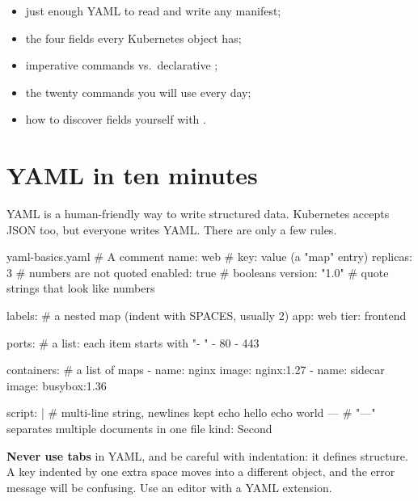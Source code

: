 
\begin{objectives}
\begin{itemize}
  \item just enough YAML to read and write any manifest;
  \item the four fields every Kubernetes object has;
  \item imperative commands vs.\ declarative ;
  \item the twenty  commands you will use every day;
  \item how to discover fields yourself with .
\end{itemize}
\end{objectives}

\section{YAML in ten minutes}

YAML is a human-friendly way to write structured data. Kubernetes accepts JSON
too, but everyone writes YAML. There are only a few rules.

\begin{yamlcode}{yaml-basics.yaml}
# A comment
name: web                 # key: value (a "map" entry)
replicas: 3               # numbers are not quoted
enabled: true             # booleans
version: "1.0"            # quote strings that look like numbers

labels:                   # a nested map (indent with SPACES, usually 2)
  app: web
  tier: frontend

ports:                    # a list: each item starts with "- "
  - 80
  - 443

containers:               # a list of maps
  - name: nginx
    image: nginx:1.27
  - name: sidecar
    image: busybox:1.36

script: |                 # multi-line string, newlines kept
  echo hello
  echo world
---
# "---" separates multiple documents in one file
kind: Second
\end{yamlcode}

\begin{warningbox}
\textbf{Never use tabs} in YAML, and be careful with indentation: it defines
structure. A key indented by one extra space moves into a different object, and
the error message will be confusing. Use an editor with a YAML extension.
\end{warningbox}

